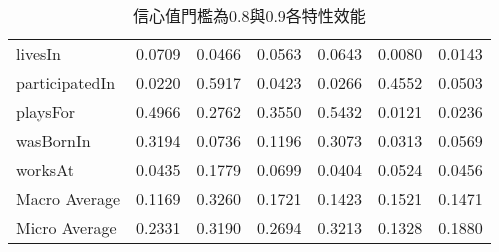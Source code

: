 \begin{table}[htbp]
\begin{tabular}{|l||c|c|c||c|c|c|}
    livesIn & 0.0709 & 0.0466 & 0.0563 & 0.0643 & 0.0080 & 0.0143 \\
    participatedIn & 0.0220 & 0.5917 & 0.0423 & 0.0266 & 0.4552 & 0.0503 \\
    playsFor & 0.4966 & 0.2762 & 0.3550 & 0.5432 & 0.0121 & 0.0236 \\
    wasBornIn & 0.3194 & 0.0736 & 0.1196 & 0.3073 & 0.0313 & 0.0569 \\
    worksAt & 0.0435 & 0.1779 & 0.0699 & 0.0404 & 0.0524 & 0.0456 \\
    \hline
    Macro Average & 0.1169 & 0.3260 & 0.1721 & 0.1423 & 0.1521 & 0.1471 \\
    Micro Average & 0.2331 & 0.3190 & 0.2694 & 0.3213 & 0.1328 & 0.1880 \\
    \hline
\end{tabular}
\caption{信心值門檻為0.8與0.9各特性效能}
\label{t:confidence}
\end{table}

